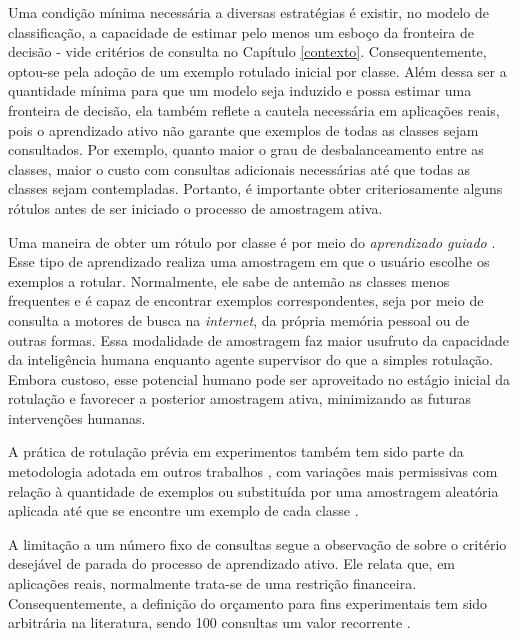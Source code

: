 Uma condição mínima necessária a diversas estratégias é existir, no modelo de classificação, a capacidade de estimar pelo menos um esboço da fronteira de decisão - vide critérios de consulta no Capítulo \ref{contexto}.
Consequentemente, optou-se pela adoção de um exemplo rotulado inicial por classe.
Além dessa ser a quantidade mínima para que um modelo seja induzido e possa estimar uma fronteira de decisão, ela também reflete a cautela necessária em aplicações reais, pois o aprendizado ativo não garante que exemplos de todas as classes sejam consultados.
Por exemplo, quanto maior o grau de desbalanceamento entre as classes, maior o custo com consultas adicionais necessárias até que todas as classes sejam contempladas.
Portanto, é importante obter criteriosamente alguns rótulos antes de ser iniciado o processo de amostragem ativa.

Uma maneira de obter um rótulo por classe é por meio do \textit{aprendizado guiado} \cite{conf/kdd/AttenbergP10}.
Esse tipo de aprendizado realiza uma amostragem em que o usuário escolhe os exemplos a rotular.
Normalmente, ele sabe de antemão as classes menos frequentes e é capaz de encontrar exemplos correspondentes, seja por meio de consulta a motores de busca na \textit{internet}, da própria memória pessoal ou de outras formas.
Essa modalidade de amostragem faz maior usufruto da capacidade da inteligência humana enquanto agente supervisor do que a simples rotulação.
Embora custoso, esse potencial humano pode ser aproveitado no estágio inicial da rotulação e favorecer a posterior amostragem ativa, minimizando as futuras intervenções humanas.

A prática de rotulação prévia em experimentos também tem sido parte da metodologia adotada em outros trabalhos \cite{conf/nips/GuoS07, conf/cvpr/BiswasP13, conf/iconip/GuJC14a}, com variações mais permissivas com relação à quantidade de exemplos \cite{journals/prl/PatraB12} ou substituída por uma amostragem aleatória aplicada até que se encontre um exemplo de cada classe \cite{chermanaprendizado}.

A limitação a um número fixo de consultas segue a observação de  sobre o critério desejável de parada do processo de aprendizado ativo. 
Ele relata que, em aplicações reais, normalmente trata-se de uma restrição financeira.
Consequentemente, a definição do orçamento para fins experimentais tem sido arbitrária na literatura, sendo 100 consultas um valor recorrente \cite{journals/pieee/CrawfordTY13,chermanaprendizado,conf/nips/SettlesCR07,conf/icml/RoyM01,conf/emnlp/SettlesC08}.
 
